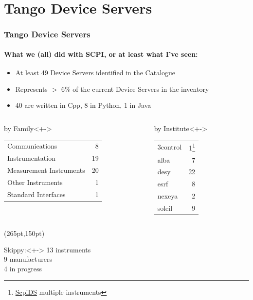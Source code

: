 \documentclass{beamer}
\begin{document}
\section{Tango Device Servers}

\begin{frame}
  \frametitle{Tango Device Servers}
  \framesubtitle{What we (all) did with SCPI, or at least what I've seen:}
  \begin{itemize}
    \item<+-> At least 49 Device Servers identified in the Catalogue
    \item<+-> Represents $>$ 6\% of the current Device Servers in the inventory
    \item<+-> 40 are written in Cpp, 8 in Python, 1 in Java
  \end{itemize}
  \begin{columns}
    \begin{column}{0.45\textwidth}
      \begin{exampleblock}{by Family}<+->
         \begin{tabular}{lr}
           Communications          &  8 \\
           Instrumentation         & 19 \\
           Measurement Instruments & 20 \\
           Other Instruments       &  1 \\
           Standard Interfaces     &  1 \\
         \end{tabular}
      \end{exampleblock}
    \end{column}
    \begin{column}{0.45\textwidth}
      \begin{exampleblock}{by Institute}<+->
          \begin{tabular}{lr}
            3control & 1\footnote{\href{https://www.tango-controls.org/developers/dsc/ds/1508/}{ScpiDS} multiple instruments} \\
            alba & 7 \\
            desy & 22 \\
            esrf & 8 \\
            nexeya & 2 \\
            soleil & 9 \\
          \end{tabular}
      \end{exampleblock}
    \end{column}
  \end{columns}
  \begin{textblock*}{75pt}(265pt,150pt)
    \begin{alertblock}{Skippy:}<+->
      13 instruments\\
      9 manufacturers\\
      4 in progress
    \end{alertblock}
  \end{textblock*}
\end{frame}
\end{document}
